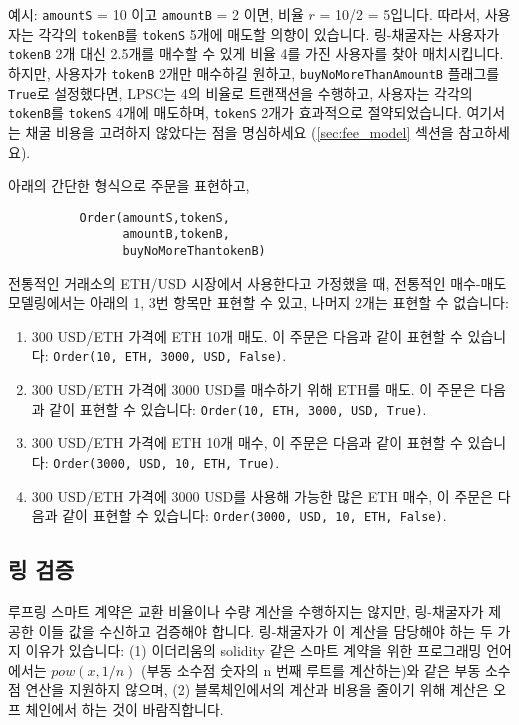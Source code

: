 \documentclass[UTF8,nofonts]{article}
\begin{document}
\begin{multicols}{2}
예시: \verb|amountS| = 10 이고 \verb|amountB| = 2 이면, 비율 $r$ = 10/2 = 5입니다. 따라서, 사용자는 각각의 \verb|tokenB|를 \verb|tokenS| 5개에 매도할 의향이 있습니다. 링-채굴자는 사용자가 \verb|tokenB| 2개 대신 2.5개를 매수할 수 있게 비율 4를 가진 사용자를 찾아 매치시킵니다. 하지만, 사용자가 \verb|tokenB| 2개만 매수하길 원하고, \verb|buyNoMoreThanAmountB| 플래그를 \verb|True|로 설정했다면, LPSC는 4의 비율로 트랜잭션을 수행하고, 사용자는 각각의 \verb|tokenB|를 \verb|tokenS| 4개에 매도하며, \verb|tokenS| 2개가 효과적으로 절약되었습니다. 여기서는 채굴 비용을 고려하지 않았다는 점을 명심하세요 (\ref{sec:fee_model} 섹션을 참고하세요).  

아래의 간단한 형식으로 주문을 표현하고,

\begin{verbatim}
	      Order(amountS,tokenS,
	            amountB,tokenB,
	            buyNoMoreThantokenB)
\end{verbatim}


전통적인 거래소의 ETH/USD 시장에서 사용한다고 가정했을 때, 전통적인 매수-매도 모델링에서는 아래의 1, 3번 항목만 표현할 수 있고, 나머지 2개는 표현할 수 없습니다:

\begin{enumerate}
	\item 300 USD/ETH 가격에 ETH 10개 매도. 이 주문은 다음과 같이 표현할 수 있습니다: \verb|Order(10, ETH, 3000, USD, False)|.
	\item 300 USD/ETH 가격에 3000 USD를 매수하기 위해 ETH를 매도. 이 주문은 다음과 같이 표현할 수 있습니다: \verb|Order(10, ETH, 3000, USD, True)|.
	\item 300 USD/ETH 가격에 ETH 10개 매수, 이 주문은 다음과 같이 표현할 수 있습니다: \verb|Order(3000, USD, 10, ETH, True)|.
	\item 300 USD/ETH 가격에 3000 USD를 사용해 가능한 많은 ETH 매수, 이 주문은 다음과 같이 표현할 수 있습니다: \verb|Order(3000, USD, 10, ETH, False)|.
\end{enumerate}



\subsection{링 검증\label{sec:ring_verification}}
루프링 스마트 계약은 교환 비율이나 수량 계산을 수행하지는 않지만, 링-채굴자가 제공한 이들 값을 수신하고 검증해야 합니다. 링-채굴자가 이 계산을 담당해야 하는 두 가지 이유가 있습니다: (1) 이더리움의 solidity\cite{dannen2017introducing} 같은 스마트 계약을 위한 프로그래밍 언어에서는 $pow(x, 1/n)$ (부동 소수점 숫자의 n 번째 루트를 계산하는)와 같은 부동 소수점 연산을 지원하지 않으며, (2) 블록체인에서의 계산과 비용을 줄이기 위해 계산은 오프 체인에서 하는 것이 바람직합니다. 



\end{multicols}
\end{document}
